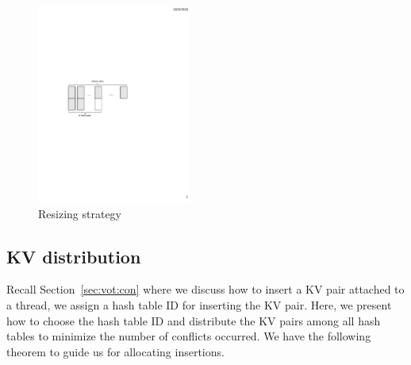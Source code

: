 \begin{figure}[t]
	\centering
	\includegraphics[width=0.45\textwidth]{fig/MultiTable.pdf}
	\caption{Resizing strategy}
	\label{fig:resize}
\end{figure}
\subsection{KV distribution}\label{sec:dyn:distribute}
Recall Section~\ref{sec:vot:con} where we discuss how to insert a KV pair attached to a thread, 
we assign a hash table ID for inserting the KV pair.
Here, we present how to choose the hash table ID and distribute the KV pairs among all hash tables to minimize the number of conflicts occurred.
We have the following theorem to guide us for allocating insertions. 

